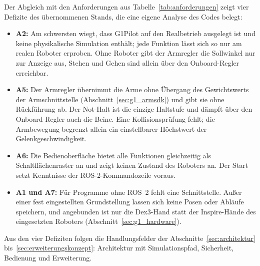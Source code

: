 Der Abgleich mit den Anforderungen aus Tabelle~\ref{tab:anforderungen} zeigt vier Defizite des übernommenen Stands, die eine eigene Analyse des Codes belegt:
\begin{itemize}
  \item \textbf{A2:} Am schwersten wiegt, dass G1Pilot auf den Realbetrieb ausgelegt ist und keine physikalische Simulation enthält; jede Funktion lässt sich so nur am realen Roboter erproben. Ohne Roboter gibt der Armregler die Sollwinkel nur zur Anzeige aus, Stehen und Gehen sind allein über den Onboard-Regler erreichbar.
  \item \textbf{A5:} Der Armregler übernimmt die Arme ohne Übergang des Gewichtswerts der Armschnittstelle (Abschnitt~\ref{sec:g1_armsdk}) und gibt sie ohne Rückführung ab. Der Not-Halt ist die einzige Haltstufe und dämpft über den Onboard-Regler auch die Beine. Eine Kollisionsprüfung fehlt; die Armbewegung begrenzt allein ein einstellbarer Höchstwert der Gelenkgeschwindigkeit.
  \item \textbf{A6:} Die Bedienoberfläche bietet alle Funktionen gleichzeitig als Schaltflächenraster an und zeigt keinen Zustand des Roboters an. Der Start setzt Kenntnisse der ROS-2-Kommandozeile voraus.
  \item \textbf{A1 und A7:} Für Programme ohne ROS~2 fehlt eine Schnittstelle. Außer einer fest eingestellten Grundstellung lassen sich keine Posen oder Abläufe speichern, und angebunden ist nur die Dex3-Hand statt der Inspire-Hände des eingesetzten Roboters (Abschnitt~\ref{sec:g1_hardware}).
\end{itemize}
Aus den vier Defiziten folgen die Handlungsfelder der Abschnitte~\ref{sec:architektur} bis~\ref{sec:erweiterungskonzept}: Architektur mit Simulationspfad, Sicherheit, Bedienung und Erweiterung.

